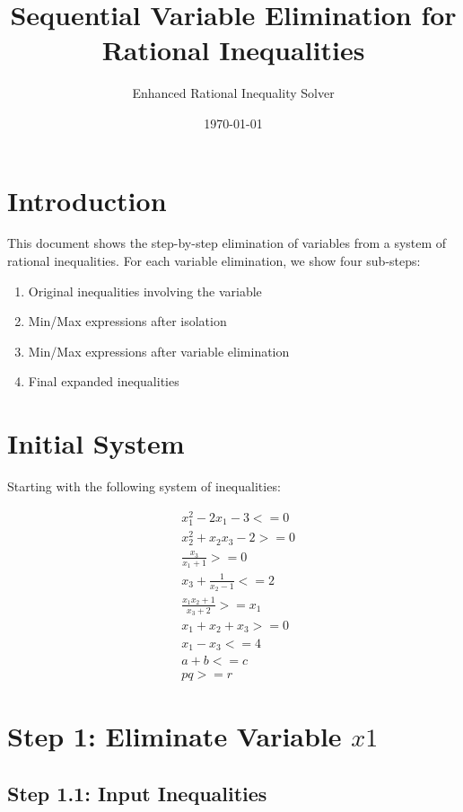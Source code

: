 \documentclass{article}
\title{Sequential Variable Elimination for Rational Inequalities}
\author{Enhanced Rational Inequality Solver}
\date{\today}
\begin{document}
\maketitle

\section{Introduction}

This document shows the step-by-step elimination of variables from a system of rational inequalities. 
For each variable elimination, we show four sub-steps:
\begin{enumerate}
\item Original inequalities involving the variable
\item Min/Max expressions after isolation
\item Min/Max expressions after variable elimination
\item Final expanded inequalities
\end{enumerate}

\section{Initial System}

Starting with the following system of inequalities:

\begin{align}
& x_{1}^{2} - 2 x_{1} - 3 <= 0 \\
& x_{2}^{2} + x_{2} x_{3} - 2 >= 0 \\
& \frac{x_{3}}{x_{1} + 1} >= 0 \\
& x_{3} + \frac{1}{x_{2} - 1} <= 2 \\
& \frac{x_{1} x_{2} + 1}{x_{3} + 2} >= x_{1} \\
& x_{1} + x_{2} + x_{3} >= 0 \\
& x_{1} - x_{3} <= 4 \\
& a + b <= c \\
& p q >= r
\end{align}

\section{Step 1: Eliminate Variable $x1$}

\subsection{Step 1.1: Input Inequalities}
\end{document}
